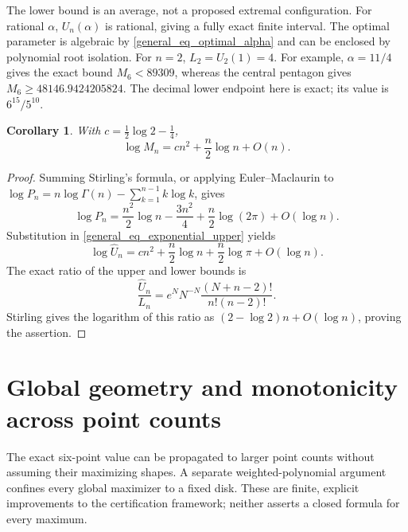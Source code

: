 \documentclass[11pt]{article}
\newtheorem{corollary}[theorem]{Corollary}
\theoremstyle{remark}
\numberwithin{equation}{section}
\begin{document}
The lower bound is an average, not a proposed extremal configuration.
For rational $\alpha$, $U_n(\alpha)$ is rational, giving a fully exact
finite interval. The optimal parameter is algebraic by
\eqref{general_eq_optimal_alpha} and can be enclosed by polynomial
root isolation. For $n=2$, $L_2=U_2(1)=4$.
For example, $\alpha=11/4$ gives the exact bound $M_6<89309$, whereas
the central pentagon gives $M_6\ge48146.9424205824$.
The decimal lower endpoint here is exact; its value is $6^{15}/5^{10}$.

\begin{corollary}\label{general_cor_asymptotic}
With $c=\tfrac12\log2-\tfrac14$,
\begin{equation}\label{general_eq_asymptotic}
 \log M_n=cn^2+\frac n2\log n+O(n).
\end{equation}
\end{corollary}
\begin{proof}
Summing Stirling's formula, or applying Euler--Maclaurin to
$\log P_n=n\log\Gamma(n)-\sum_{k=1}^{n-1}k\log k$, gives
\[
 \log P_n=\frac{n^2}{2}\log n-\frac{3n^2}{4}
            +\frac n2\log(2\pi)+O(\log n).
\]
Substitution in \eqref{general_eq_exponential_upper} yields
\[
 \log\widehat U_n=cn^2+\frac n2\log n
                      +\frac n2\log\pi+O(\log n).
\]
The exact ratio of the upper and lower bounds is
\[
 \frac{\widehat U_n}{L_n}
 =e^NN^{-N}\frac{(N+n-2)!}{n!(n-2)!}.
\]
Stirling gives the logarithm of this ratio as
$(2-\log2)n+O(\log n)$, proving the assertion.
\end{proof}

\section{Global geometry and monotonicity across point counts}
\label{sec:deletion-radius}

The exact six-point value can be propagated to larger point counts
without assuming their maximizing shapes. A separate weighted-polynomial
argument confines every global maximizer to a fixed disk. These are
finite, explicit improvements to the certification framework; neither
asserts a closed formula for every maximum.
\end{document}
